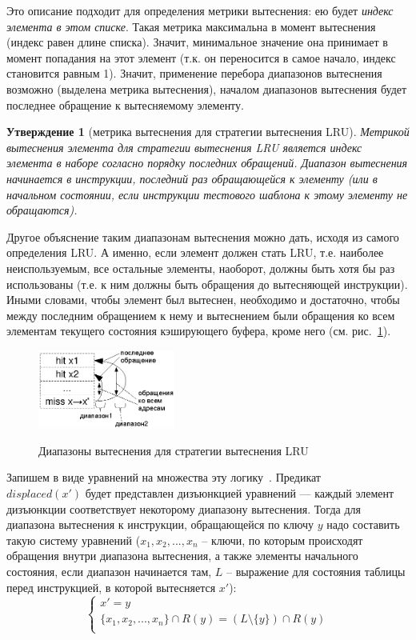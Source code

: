 \documentclass[14pt]{extreport}
\newtheorem{utv}{Утверждение}
\newcommand{\LRU}{\textsf{LRU}\xspace}
\begin{document}
Это описание подходит для определения метрики вытеснения: ею будет
\emph{индекс элемента в этом списке}. Такая метрика максимальна в
момент вытеснения (индекс равен длине списка). Значит, минимальное значение
она принимает в момент попадания на этот элемент (т.к. он
переносится в самое начало, индекс становится равным 1). Значит,
применение перебора диапазонов вытеснения возможно (выделена метрика
вытеснения), началом диапазонов вытеснения будет последнее обращение
к вытесняемому элементу.

\begin{utv}[метрика вытеснения для стратегии вытеснения \LRU]
Метрикой вытеснения элемента для стратегии вытеснения \LRU является
индекс элемента в наборе согласно порядку последних обращений.
Диапазон вытеснения начинается в инструкции, последний раз
обращающейся к элементу (или в начальном состоянии, если инструкции
тестового шаблона к этому элементу не обращаются).
\end{utv}

Другое объяснение таким диапазонам вытеснения можно дать, исходя из
самого определения \LRU. А именно, если элемент должен стать \LRU,
т.е. наиболее неиспользуемым, все остальные элементы, наоборот,
должны быть хотя бы раз использованы (т.е. к ним должны быть
обращения до вытесняющей инструкции). Иными словами, чтобы элемент
был вытеснен, необходимо и достаточно, чтобы между последним
обращением к нему и вытеснением были обращения ко всем элементам
текущего состояния кэширующего буфера, кроме него (см.
рис.~\ref{lru-ranges}).

\begin{figure}[h] \center
  \includegraphics[width=0.4\textwidth]{2.theor/lru}\\
  \caption{Диапазоны вытеснения для стратегии вытеснения \LRU}\label{lru-ranges}
\end{figure}

Запишем в виде уравнений на множества эту логику~\cite{my_syrcose_2009}.
Предикат\\
$displaced(x')$ будет представлен дизъюнкцией уравнений --- каждый
элемент дизъюнкции соответствует некоторому диапазону вытеснения.
Тогда для диапазона вытеснения к инструкции, обращающейся по ключу
$y$ надо составить такую систему уравнений ($x_1, x_2, ..., x_n$ --
ключи, по которым происходят обращения внутри диапазона
вытеснения, а также элементы начального состояния, если диапазон начинается там,
$L$ --
выражение для состояния таблицы перед инструкцией, в которой вытесняется $x'$):
$$
\left\{
   \begin{array}{l}
    x' = y \\
    \{x_1, x_2, ..., x_n\} \cap R(y) = (L \setminus \{y\}) \cap R(y)\\
   \end{array}
  \right.
$$
\end{document}

